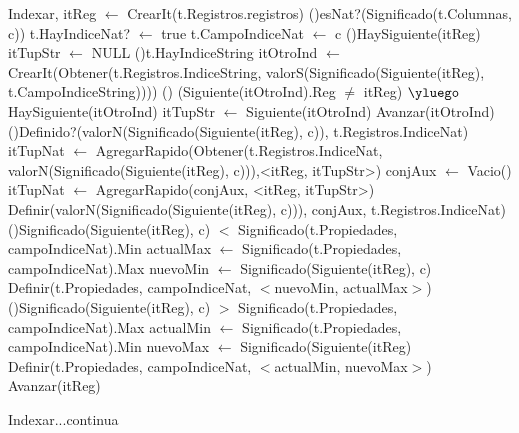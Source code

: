 \begin{Algoritmos}
  
\begin{algoritmo}{Indexar}{, }{}
     itReg $\leftarrow$ CrearIt(t.Registros.registros) 
     \If(){esNat?(Significado(t.Columnas, c))}{
     	t.HayIndiceNat? $\leftarrow$ true 
        t.CampoIndiceNat $\leftarrow$ c 
         \While(){HaySiguiente(itReg)}{
         	itTupStr $\leftarrow$ NULL 
            \If(){t.HayIndiceString}{
            	itOtroInd $\leftarrow$ CrearIt(Obtener(t.Registros.IndiceString, valorS(Significado(Siguiente(itReg), t.CampoIndiceString)))) 
                \While(){ (Siguiente(itOtroInd).Reg $\neq$ itReg) $\yluego$ HaySiguiente(itOtroInd)}{
                	itTupStr $\leftarrow$ Siguiente(itOtroInd) 
                	Avanzar(itOtroInd) 
                }
            }
         	\eIf(){Definido?(valorN(Significado(Siguiente(itReg), c)), t.Registros.IndiceNat)}{
             	itTupNat $\leftarrow$ AgregarRapido(Obtener(t.Registros.IndiceNat, valorN(Significado(Siguiente(itReg), c))),<itReg, itTupStr>) 
             }{
               conjAux $\leftarrow$ Vacio() 
               itTupNat $\leftarrow$ AgregarRapido(conjAux, <itReg, itTupStr>) 
               Definir(valorN(Significado(Siguiente(itReg), c))), conjAux, t.Registros.IndiceNat) 
             }
            \If(){Significado(Siguiente(itReg), c) $<$ Significado(t.Propiedades, campoIndiceNat).Min}{
                actualMax $\gets$ Significado(t.Propiedades, campoIndiceNat).Max 
                nuevoMin $\gets$ Significado(Siguiente(itReg), c) 
                Definir(t.Propiedades, campoIndiceNat, $<$nuevoMin, actualMax$>$) 
            }
            \If(){Significado(Siguiente(itReg), c) $>$ Significado(t.Propiedades, campoIndiceNat).Max}{
                actualMin $\gets$ Significado(t.Propiedades, campoIndiceNat).Min 
                nuevoMax $\gets$ Significado(Siguiente(itReg) 
                Definir(t.Propiedades, campoIndiceNat, $<$actualMin, nuevoMax$>$) 
            }
             Avanzar(itReg) 
         }
     }
\end{algoritmo}
\begin{algoritmo}{Indexar}{...continua}{}


\end{algoritmo}
\end{Algoritmos}

